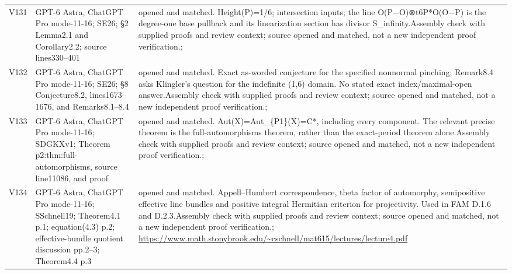\begin{longtable}{@{}L{.08\linewidth}L{.31\linewidth}L{.56\linewidth}@{}}
V131 & GPT-6 Astra, ChatGPT Pro mode-11-16; S\newline E26; §2 Lemma2.1 and Corollary2.2; source lines330--401 & opened and matched. Height(P)=1/\allowbreak{}6; intersection inputs; the line O(P−O)⊗t6P*O(O−P) is the degree-one base pullback and its linearization section has divisor S\_\allowbreak{}infinity.\newline Assembly check with supplied proofs and review context; source opened and matched, not a new independent proof verification.\newline {}; \\
V132 & GPT-6 Astra, ChatGPT Pro mode-11-16; S\newline E26; §8 Conjecture8.2, lines1673--1676, and Remarks8.1--8.4 & opened and matched. Exact as-worded conjecture for the specified nonnormal pinching; Remark8.4 asks Klingler’s question for the indefinite (1,6) domain. No stated exact index/\allowbreak{}maximal-open answer.\newline Assembly check with supplied proofs and review context; source opened and matched, not a new independent proof verification.\newline {}; \\
V133 & GPT-6 Astra, ChatGPT Pro mode-11-16; S\newline DGKXv1; Theorem p2:\allowbreak{}thm:\allowbreak{}full-automorphisms, source line11086, and proof & opened and matched. Aut(X)=Aut\_\allowbreak{}\{P1\}(X)=C*, including every component. The relevant precise theorem is the full-automorphisms theorem, rather than the exact-period theorem alone.\newline Assembly check with supplied proofs and review context; source opened and matched, not a new independent proof verification.\newline {}; \\
V134 & GPT-6 Astra, ChatGPT Pro mode-11-16; S\newline Schnell19; Theorem4.1 p.1; equation(4.3) p.2; effective-bundle quotient discussion pp.2--3; Theorem4.4 p.3 & opened and matched. Appell--Humbert correspondence, theta factor of automorphy, semipositive effective line bundles and positive integral Hermitian criterion for projectivity. Used in FAM D.1.6 and D.2.3.\newline Assembly check with supplied proofs and review context; source opened and matched, not a new independent proof verification.\newline {}; \url{https://www.math.stonybrook.edu/~cschnell/mat615/lectures/lecture4.pdf}\\

\end{longtable}
